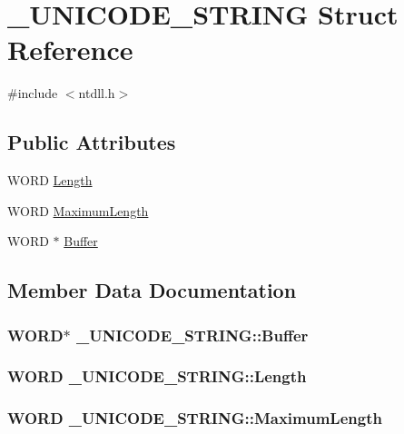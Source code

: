 \section{\-\_\-\-U\-N\-I\-C\-O\-D\-E\-\_\-\-S\-T\-R\-I\-N\-G Struct Reference}
\label{struct___u_n_i_c_o_d_e___s_t_r_i_n_g}


{\ttfamily \#include $<$ntdll.\-h$>$}

\subsection*{Public Attributes}
\begin{DoxyCompactItemize}
\item 
W\-O\-R\-D \hyperlink{struct___u_n_i_c_o_d_e___s_t_r_i_n_g_a4acc3d907c2b81a9024fd181fb28d134}{Length}
\item 
W\-O\-R\-D \hyperlink{struct___u_n_i_c_o_d_e___s_t_r_i_n_g_aa5c420fa9ce3b68f5674fb9dc5459829}{Maximum\-Length}
\item 
W\-O\-R\-D $\ast$ \hyperlink{struct___u_n_i_c_o_d_e___s_t_r_i_n_g_a7307c0583ca2b1bac0d7083bbcfbc37e}{Buffer}
\end{DoxyCompactItemize}


\subsection{Member Data Documentation}
\subsubsection[{Buffer}]{\setlength{\rightskip}{0pt plus 5cm}W\-O\-R\-D$\ast$ \-\_\-\-U\-N\-I\-C\-O\-D\-E\-\_\-\-S\-T\-R\-I\-N\-G\-::\-Buffer}\label{struct___u_n_i_c_o_d_e___s_t_r_i_n_g_a7307c0583ca2b1bac0d7083bbcfbc37e}
\subsubsection[{Length}]{\setlength{\rightskip}{0pt plus 5cm}W\-O\-R\-D \-\_\-\-U\-N\-I\-C\-O\-D\-E\-\_\-\-S\-T\-R\-I\-N\-G\-::\-Length}\label{struct___u_n_i_c_o_d_e___s_t_r_i_n_g_a4acc3d907c2b81a9024fd181fb28d134}
\subsubsection[{Maximum\-Length}]{\setlength{\rightskip}{0pt plus 5cm}W\-O\-R\-D \-\_\-\-U\-N\-I\-C\-O\-D\-E\-\_\-\-S\-T\-R\-I\-N\-G\-::\-Maximum\-Length}\label{struct___u_n_i_c_o_d_e___s_t_r_i_n_g_aa5c420fa9ce3b68f5674fb9dc5459829}
